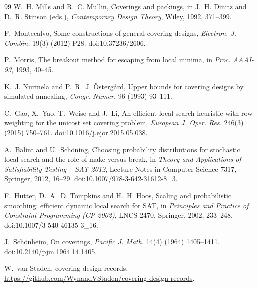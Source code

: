 \documentclass[11pt]{article}
\theoremstyle{remark}
\begin{document}
\begin{thebibliography}{99}
 W.~H. Mills and R.~C. Mullin, Coverings and packings, in J.~H. Dinitz and D.~R. Stinson
(eds.), \emph{Contemporary Design Theory}, Wiley, 1992, 371--399.

 F.~Montecalvo, Some constructions of general covering designs, \emph{Electron. J. Combin.}
19(3) (2012) P28. doi:10.37236/2606.

 P.~Morris, The breakout method for escaping from local minima, in \emph{Proc. AAAI-93}, 1993,
40--45.

 K.~J. Nurmela and P.~R.~J. \"Osterg\aa rd, Upper bounds for covering designs by simulated
annealing, \emph{Congr. Numer.} 96 (1993) 93--111.

 C.~Gao, X.~Yao, T.~Weise and J.~Li, An efficient local search heuristic with row weighting for the
unicost set covering problem, \emph{European J. Oper. Res.} 246(3) (2015) 750--761.
doi:10.1016/j.ejor.2015.05.038.

 A.~Balint and U.~Sch\"oning, Choosing probability distributions for stochastic local search and
the role of make versus break, in \emph{Theory and Applications of Satisfiability Testing -- SAT 2012}, Lecture Notes
in Computer Science 7317, Springer, 2012, 16--29. doi:10.1007/978-3-642-31612-8\_3.

 F.~Hutter, D.~A.~D. Tompkins and H.~H. Hoos, Scaling and probabilistic smoothing: efficient dynamic
local search for SAT, in \emph{Principles and Practice of Constraint Programming (CP 2002)}, LNCS 2470, Springer,
2002, 233--248. doi:10.1007/3-540-46135-3\_16.

 J.~Sch\"onheim, On coverings, \emph{Pacific J. Math.} 14(4) (1964) 1405--1411. doi:10.2140/pjm.1964.14.1405.

 W.~van Staden, covering-design-records,
\url{https://github.com/WynandVStaden/covering-design-records}.

\end{thebibliography}
\end{document}
